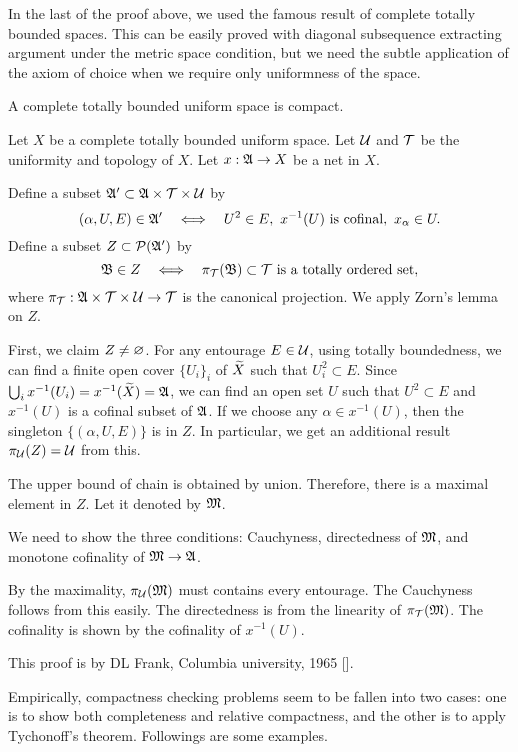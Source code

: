 \documentclass{../exp}
\begin{document}
In the last of the proof above, we used the famous result of complete totally bounded spaces.
This can be easily proved with diagonal subsequence extracting argument under the metric space condition, but we need the subtle application of the axiom of choice when we require only uniformness of the space.

\begin{thm}
A complete totally bounded uniform space is compact.
\end{thm}
\begin{pf}[1]
Let $X$ be a complete totally bounded uniform space.
Let $\mathcal{U}$ and $\mathcal{T}$ be the uniformity and topology of $X$.
Let $x:\fA\to X$ be a net in $X$.

Define a subset $\mathfrak{A}'\subset\mathfrak{A}\times\mathcal{T}\times\mathcal{U}$ by
\[(\alpha,U,E)\in\fA'\iff U^2\in E,\ x^{-1}(U)\text{ is cofinal},\ x_\alpha\in U.\]
Define a subset $Z\subset\mathcal{P}(\mathfrak{A}')$ by
\[\fB\in Z\iff \pi_\cT(\fB)\subset\cT\text{ is a totally ordered set},\]
where $\pi_\cT:\fA\x\cT\x\cU\to\cT$ is the canonical projection.
We apply Zorn's lemma on $Z$.

First, we claim $Z\ne\varnothing$.
For any entourage $E\in\mathcal{U}$, using totally boundedness, we can find a finite open cover $\{U_i\}_i$ of $\widetilde X$ such that $U_i^2\subset E$.
Since $\bigcup_ix^{-1}(U_i)=x^{-1}(\widetilde X)=\mathfrak{A}$, we can find an open set $U$ such that $U^2\subset E$ and $x^{-1}(U)$ is a cofinal subset of $\mathfrak{A}$.
If we choose any $\alpha\in x^{-1}(U)$, then the singleton $\{(\alpha,U,E)\}$ is in $Z$.
In particular, we get an additional result $\pi_{\mathcal{U}}(Z)=\mathcal{U}$ from this.

The upper bound of chain is obtained by union.
Therefore, there is a maximal element in $Z$.
Let it denoted by $\mathfrak{M}$.

We need to show the three conditions: Cauchyness, directedness of $\mathfrak{M}$, and monotone cofinality of $\fM\to\fA$.

By the maximality, $\pi_{\mathcal{U}}(\mathfrak{M})$ must contains every entourage.
The Cauchyness follows from this easily.
The directedness is from the linearity of $\pi_{\mathcal{T}}(\mathfrak{M})$.
The cofinality is shown by the cofinality of $x^{-1}(U)$.
\end{pf}
\begin{pf}[2]
This proof is by DL Frank, Columbia university, 1965 [].

\end{pf}


Empirically, compactness checking problems seem to be fallen into two cases: one is to show both completeness and relative compactness, and the other is to apply Tychonoff's theorem.
Followings are some examples.
\end{document}
